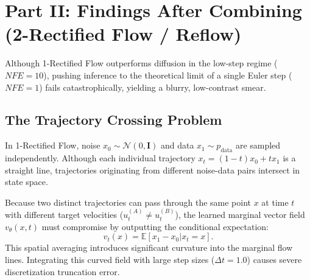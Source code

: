 \documentclass[conference]{IEEEtran}
\begin{document}
\section{Part II: Findings After Combining (2-Rectified Flow / Reflow)}

Although 1-Rectified Flow outperforms diffusion in the low-step regime ($NFE = 10$), pushing inference to the theoretical limit of a single Euler step ($NFE = 1$) fails catastrophically, yielding a blurry, low-contrast smear.

\subsection{The Trajectory Crossing Problem}
In 1-Rectified Flow, noise $x_0 \sim \mathcal{N}(0, \mathbf{I})$ and data $x_1 \sim p_{\text{data}}$ are sampled independently. Although each individual trajectory $x_t = (1-t)x_0 + t x_1$ is a straight line, trajectories originating from different noise-data pairs intersect in state space.

Because two distinct trajectories can pass through the same point $x$ at time $t$ with different target velocities ($u_t^{(A)} \ne u_t^{(B)}$), the learned marginal vector field $v_\theta(x, t)$ must compromise by outputting the conditional expectation:
\begin{equation}
v_t(x) = \mathbb{E}[x_1 - x_0 | x_t = x].
\end{equation}
This spatial averaging introduces significant curvature into the marginal flow lines. Integrating this curved field with large step sizes ($\Delta t = 1.0$) causes severe discretization truncation error.
\end{document}
